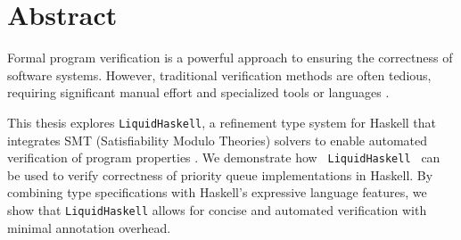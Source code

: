 
\clearpage
{}
\section*{Abstract}

\begin{center}
	\begin{minipage}[t]{0.7\textwidth}

		Formal program verification is a powerful approach to ensuring the correctness of software systems.
		However, traditional verification methods are often tedious,
		requiring significant manual effort and specialized tools or languages \cite{rondonLiquidTypes2008}.

		This thesis explores \texttt{LiquidHaskell},
		a refinement type system for Haskell that integrates SMT (Satisfiability Modulo Theories) solvers to enable automated verification of program properties \cite{vazou2018}.
		We demonstrate how \texttt{ LiquidHaskell } can be used to verify correctness of priority queue implementations in Haskell.
		By combining type specifications with Haskell’s expressive language features,
		we show that \texttt{LiquidHaskell} allows for concise and automated verification with minimal annotation overhead.
	\end{minipage}
\end{center}

\vfill




\thispagestyle{empty}
